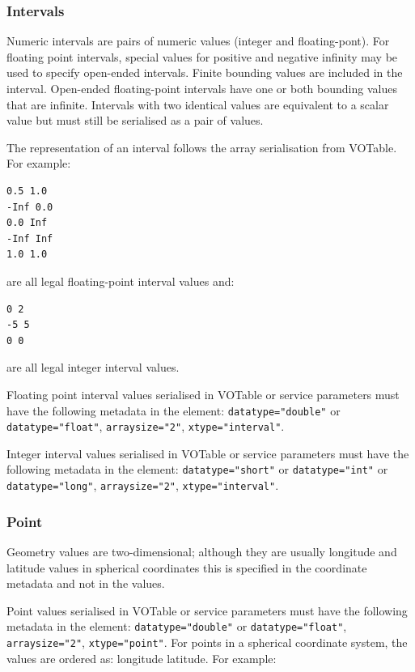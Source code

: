 \documentclass[11pt,letter]{ivoa}
\begin{document}
\subsubsection{Intervals}
Numeric intervals are pairs of numeric values (integer and floating-pont). For floating point 
intervals, special values for positive and negative infinity may be used to specify open-ended intervals. 
Finite bounding values are included in the interval. Open-ended floating-point 
intervals have one or both bounding values that are infinite. Intervals with two identical values
are equivalent to a scalar value but must still be serialised as a pair of values.

The representation of an interval follows the array serialisation from VOTable. For example:

\begin{verbatim}
0.5 1.0
-Inf 0.0
0.0 Inf
-Inf Inf
1.0 1.0
\end{verbatim}


\noindent are all legal floating-point interval values and:

\begin{verbatim}
0 2
-5 5
0 0
\end{verbatim}

\noindent are all legal integer interval values. 

Floating point interval values serialised in VOTable or service parameters must have the following metadata in the 
 element: \verb|datatype="double"| or \verb|datatype="float"|, 
\verb|arraysize="2"|, \verb|xtype="interval"|.

Integer interval values serialised in VOTable or service parameters must have the following metadata in the 
 element: \verb|datatype="short"| or \verb|datatype="int"| or 
\verb|datatype="long"|, \verb|arraysize="2"|, \verb|xtype="interval"|.

\subsubsection{Point}
Geometry values are two-dimensional; although they are usually longitude and 
latitude values in spherical coordinates this is specified in the coordinate 
metadata and not in the values. 

Point values serialised in VOTable or service parameters must have the following metadata in the 
 element: \verb|datatype="double"| or \verb|datatype="float"|, \verb|arraysize="2"|,
\verb|xtype="point"|. For points in a 
spherical coordinate system, the values are ordered as: longitude latitude. For 
example:
\end{document}
